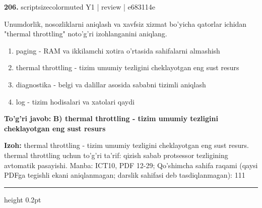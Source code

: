 \documentclass[10pt,a4paper]{article}
\begin{document}
{\bfseries\sffamily\color{ink} 206.} {scriptsizecolor{muted} Y1 | review | e683114e}
\par
Unumdorlik, nosozliklarni aniqlash va xavfsiz xizmat bo'yicha qatorlar ichidan "thermal throttling" noto'g'ri izohlanganini aniqlang.
\begin{enumerate}[label=\Alph*),leftmargin=9mm]
\item paging - RAM va ikkilamchi xotira o'rtasida sahifalarni almashish
\item thermal throttling - tizim umumiy tezligini cheklayotgan eng sust resurs
\item diagnostika - belgi va dalillar asosida sababni tizimli aniqlash
\item log - tizim hodisalari va xatolari qaydi
\end{enumerate}
\begin{tcolorbox}[enhanced,breakable,colback=teal!4,colframe=teal!60!black,boxrule=0.45pt,arc=1.2mm,left=2.7mm,right=2.7mm,top=1.8mm,bottom=1.8mm,before skip=2mm,after skip=2mm]
{\bfseries\sffamily\color{teal}To'g'ri javob:} \textbf{B) thermal throttling - tizim umumiy tezligini cheklayotgan eng sust resurs}
\par\smallskip
{\bfseries Izoh:} thermal throttling - tizim umumiy tezligini cheklayotgan eng sust resurs. thermal throttling uchun to'g'ri ta'rif: qizish sabab protsessor tezligining avtomatik pasayishi. Manba: ICT10, PDF 12-29; Qo'shimcha sahifa raqami (qaysi PDFga tegishli ekani aniqlanmagan; darslik sahifasi deb tasdiqlanmagan): 111
\end{tcolorbox}
\vspace{2mm}\hrule height 0.2pt\vspace{3mm}
\end{document}
